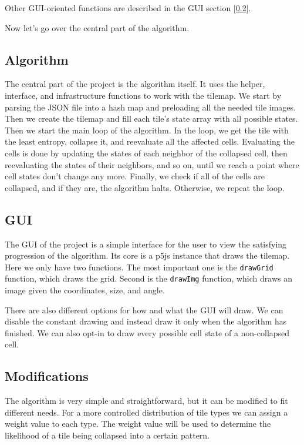 \documentclass[10pt,twoside,a4paper]{article}
\begin{document}
Other GUI-oriented functions are described in the GUI section [\ref*{sec:gui}].

Now let's go over the central part of the algorithm.


\subsection{Algorithm}\label{sec:algorithm}
The central part of the project is the algorithm itself.
It uses the helper, interface, and infrastructure functions to work with the tilemap.
We start by parsing the JSON file into a hash map and preloading all the needed tile images.
Then we create the tilemap and fill each tile's state array with all possible states.
Then we start the main loop of the algorithm.
In the loop, we get the tile with the least entropy, collapse it, and reevaluate all the affected cells.
Evaluating the cells is done by updating the states of each neighbor of the collapsed cell, then reevaluating the states of their neighbors, and so on, until we reach a point where cell states don't change any more.
Finally, we check if all of the cells are collapsed, and if they are, the algorithm halts.
Otherwise, we repeat the loop.

\subsection{GUI}\label{sec:gui}
The GUI of the project is a simple interface for the user to view the satisfying progression of the algorithm.
Its core is a p5js instance that draws the tilemap.
Here we only have two functions. 
The most important one is the \texttt{drawGrid} function, which draws the grid.
Second is the \texttt{drawImg} function, which draws an image given the coordinates, size, and angle.

There are also different options for how and what the GUI will draw.
We can disable the constant drawing and instead draw it only when the algorithm has finished.
We can also opt-in to draw every possible cell state of a non-collapsed cell.

\subsection{Modifications}\label{sec:modifications}
The algorithm is very simple and straightforward, but it can be modified to fit different needs.
For a more controlled distribution of tile types we can assign a weight value to each type.
The weight value will be used to determine the likelihood of a tile being collapsed into a certain pattern.
\end{document}
